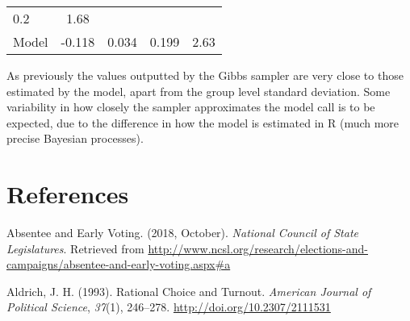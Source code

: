 \documentclass[12pt,twoside]{reedthesis}
\begin{document}
\begin{longtable}[]{@{}lcccc@{}}
\begin{minipage}[t]{0.12\columnwidth}
  0.2\strut
  \end{minipage} & \begin{minipage}[t]{0.12\columnwidth}\centering\strut
  1.68\strut
  \end{minipage}\tabularnewline
  \begin{minipage}[t]{0.25\columnwidth}\raggedright\strut
  Model\strut
  \end{minipage} & \begin{minipage}[t]{0.16\columnwidth}\centering\strut
  -0.118\strut
  \end{minipage} & \begin{minipage}[t]{0.16\columnwidth}\centering\strut
  0.034\strut
  \end{minipage} & \begin{minipage}[t]{0.12\columnwidth}\centering\strut
  0.199\strut
  \end{minipage} & \begin{minipage}[t]{0.12\columnwidth}\centering\strut
  2.63\strut
  \end{minipage}\tabularnewline
  \bottomrule
  \end{longtable}
  
  As previously the values outputted by the Gibbs sampler are very close
  to those estimated by the model, apart from the group level standard
  deviation. Some variability in how closely the sampler approximates the
  model call is to be expected, due to the difference in how the model is
  estimated in R (much more precise Bayesian processes).
  
  \backmatter
  
  \chapter{References}\label{references}
  
  \noindent
  
  \setlength{\parindent}{-0.20in} \setlength{\leftskip}{0.20in}
  \setlength{\parskip}{8pt}
  
  \hypertarget{refs}{}
  \hypertarget{ref-national_council_of_state_legislatures_absentee_2018}{}
  Absentee and Early Voting. (2018, October). \emph{National Council of
  State Legislatures}. Retrieved from
  \url{http://www.ncsl.org/research/elections-and-campaigns/absentee-and-early-voting.aspx\#a}
  
  \hypertarget{ref-aldrich_rational_1993}{}
  Aldrich, J. H. (1993). Rational Choice and Turnout. \emph{American
  Journal of Political Science}, \emph{37}(1), 246--278.
  \url{http://doi.org/10.2307/2111531}
  
\end{document}
